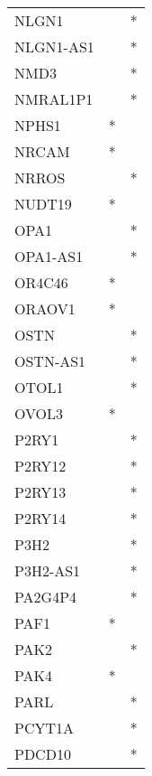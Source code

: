 \begin{longtable}{lcc}
NLGN1            &                &          * \\
NLGN1-AS1        &                &          * \\
NMD3             &                &          * \\
NMRAL1P1         &                &          * \\
NPHS1            &              * &            \\
NRCAM            &              * &            \\
NRROS            &                &          * \\
NUDT19           &              * &            \\
OPA1             &                &          * \\
OPA1-AS1         &                &          * \\
OR4C46           &              * &            \\
ORAOV1           &              * &            \\
OSTN             &                &          * \\
OSTN-AS1         &                &          * \\
OTOL1            &                &          * \\
OVOL3            &              * &            \\
P2RY1            &                &          * \\
P2RY12           &                &          * \\
P2RY13           &                &          * \\
P2RY14           &                &          * \\
P3H2             &                &          * \\
P3H2-AS1         &                &          * \\
PA2G4P4          &                &          * \\
PAF1             &              * &            \\
PAK2             &                &          * \\
PAK4             &              * &            \\
PARL             &                &          * \\
PCYT1A           &                &          * \\
PDCD10           &                &          * \\

\end{longtable}
